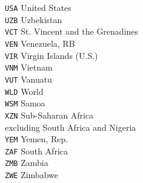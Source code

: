 \begin{multicols}{3}
{\texttt{USA}	United States\\
\texttt{UZB}	Uzbekistan\\
\texttt{VCT}	St. Vincent and the Grenadines\\
\texttt{VEN}	Venezuela, RB\\
\texttt{VIR}	Virgin Islands (U.S.)\\
\texttt{VNM}	Vietnam\\
\texttt{VUT}	Vanuatu\\
\texttt{WLD}	World\\
\texttt{WSM}	Samoa\\
\texttt{XZN}	Sub-Saharan Africa \\
excluding South Africa and Nigeria\\
\texttt{YEM}	Yemen, Rep.\\
\texttt{ZAF}	South Africa\\
\texttt{ZMB}	Zambia\\
\texttt{ZWE}	Zimbabwe
}
\end{multicols}




